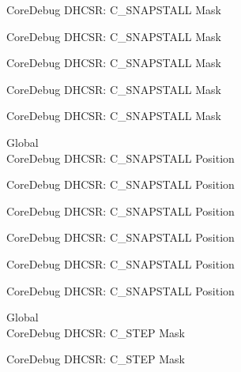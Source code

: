 \begin{DoxyRefList}
\label{deprecated__deprecated000176}%
%
Core\+Debug DHCSR\+: C\+\_\+\+SNAPSTALL Mask 

\label{deprecated__deprecated000318}%
%
Core\+Debug DHCSR\+: C\+\_\+\+SNAPSTALL Mask 

\label{deprecated__deprecated000394}%
%
Core\+Debug DHCSR\+: C\+\_\+\+SNAPSTALL Mask 

\label{deprecated__deprecated000483}%
%
Core\+Debug DHCSR\+: C\+\_\+\+SNAPSTALL Mask 

\label{deprecated__deprecated000585}%
%
Core\+Debug DHCSR\+: C\+\_\+\+SNAPSTALL Mask  
\item[Global \doxylink{group___c_m_s_i_s___core_debug_ga85747214e2656df6b05ec72e4d22bd6d}{Core\+Debug\+\_\+\+DHCSR\+\_\+\+C\+\_\+\+SNAPSTALL\+\_\+\+Pos} ]\hfill \\
\label{deprecated__deprecated000031}%
%
Core\+Debug DHCSR\+: C\+\_\+\+SNAPSTALL Position 

\label{deprecated__deprecated000175}%
%
Core\+Debug DHCSR\+: C\+\_\+\+SNAPSTALL Position 

\label{deprecated__deprecated000317}%
%
Core\+Debug DHCSR\+: C\+\_\+\+SNAPSTALL Position 

\label{deprecated__deprecated000393}%
%
Core\+Debug DHCSR\+: C\+\_\+\+SNAPSTALL Position 

\label{deprecated__deprecated000482}%
%
Core\+Debug DHCSR\+: C\+\_\+\+SNAPSTALL Position 

\label{deprecated__deprecated000584}%
%
Core\+Debug DHCSR\+: C\+\_\+\+SNAPSTALL Position  
\item[Global \doxylink{group___c_m_s_i_s___core_debug_gae6bda72fbd32cc5734ff3542170dc00d}{Core\+Debug\+\_\+\+DHCSR\+\_\+\+C\+\_\+\+STEP\+\_\+\+Msk} ]\hfill \\
\label{deprecated__deprecated000036}%
%
Core\+Debug DHCSR\+: C\+\_\+\+STEP Mask 

\label{deprecated__deprecated000124}%
%
Core\+Debug DHCSR\+: C\+\_\+\+STEP Mask 


\end{DoxyRefList}
